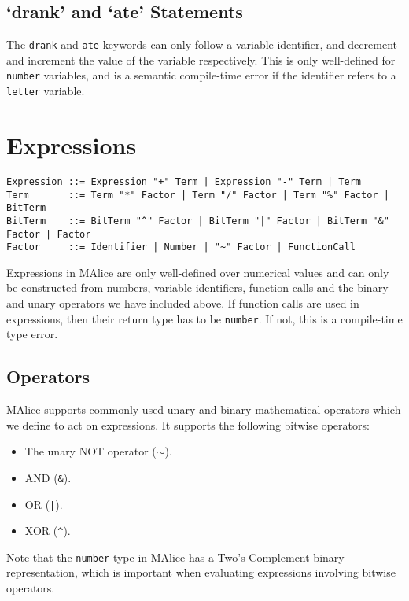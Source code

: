\documentclass[a4wide, 11pt]{article}
\begin{document}
\subsection{`drank' and `ate' Statements}

The \texttt{drank} and \texttt{ate} keywords can only follow a variable identifier, and decrement and increment the value of the variable respectively. This is only well-defined for \texttt{number} variables, and is a semantic compile-time error if the identifier refers to a \texttt{letter} variable.
  
\section{Expressions}

\begin{verbatim}
Expression ::= Expression "+" Term | Expression "-" Term | Term
Term       ::= Term "*" Factor | Term "/" Factor | Term "%" Factor | BitTerm
BitTerm    ::= BitTerm "^" Factor | BitTerm "|" Factor | BitTerm "&" Factor | Factor
Factor     ::= Identifier | Number | "~" Factor | FunctionCall
\end{verbatim}

Expressions in MAlice are only well-defined over numerical values and can only be constructed from numbers, variable identifiers, function calls and the binary and unary operators we have included above. If function calls are used in expressions, then their return type has to be \texttt{number}. If not, this is a compile-time type error.

\subsection{Operators}

MAlice supports commonly used unary and binary mathematical operators which we define to act on expressions. It supports the following bitwise operators:

\begin{itemize}

\item The unary NOT operator ($\sim$).
\item AND (\texttt{\&}).
\item OR (\texttt{|}).
\item XOR (\texttt{\^}).

\end{itemize}

Note that the \texttt{number} type in MAlice has a Two's Complement binary representation, which is important when evaluating expressions involving bitwise operators.
\end{document}
